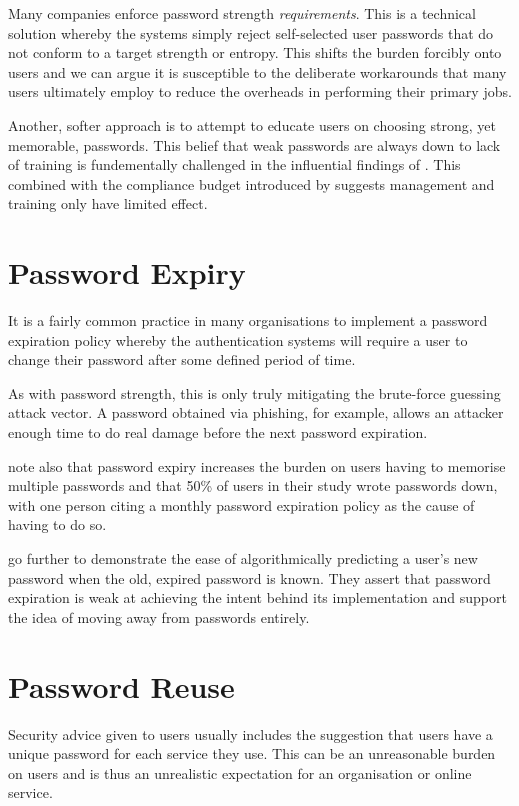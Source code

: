 \documentclass{report}
\begin{document}
Many companies enforce password strength \emph{requirements}.
This is a technical solution whereby the systems simply
reject self-selected user passwords that do not conform
to a target strength or entropy.
This shifts the burden forcibly onto
users and we can argue it is susceptible to the deliberate workarounds
that many users ultimately employ to reduce the overheads
in performing their primary jobs.

Another, softer approach is to attempt to educate users
on choosing strong, yet memorable, passwords. This belief
that weak passwords are always down to lack of training
is fundementally challenged in the influential findings
of \textcite{adams1999users}. This combined with the
compliance budget introduced by \textcite{beautement2009compliance}
suggests management and training only have limited effect.

\section{Password Expiry}

It is a fairly common practice in many organisations to
implement a password expiration policy whereby the
authentication systems will require a user to change their
password after some defined period of time.

As with password strength, this is only truly mitigating the
brute-force guessing attack vector. A password obtained via
phishing, for example, allows an attacker enough time to do
real damage before the next password expiration.

\textcite{adams1999users} note also that password expiry increases
the burden on users having to memorise multiple passwords and that
50\% of users in their study wrote passwords down, with one
person citing a monthly password expiration policy as the cause
of having to do so.

\textcite{zhang2010security} go further to demonstrate the ease of
algorithmically predicting a user's new password when the old,
expired password is known. They assert that password expiration
is weak at achieving the intent behind its implementation and
support the idea of moving away from passwords entirely.

\section{Password Reuse}

Security advice given to users usually includes the suggestion that users
have a unique password for each service they use. This can
be an unreasonable burden on users\parencite{florencio2014password}
and is thus an unrealistic expectation for an organisation or online
service.
\end{document}

